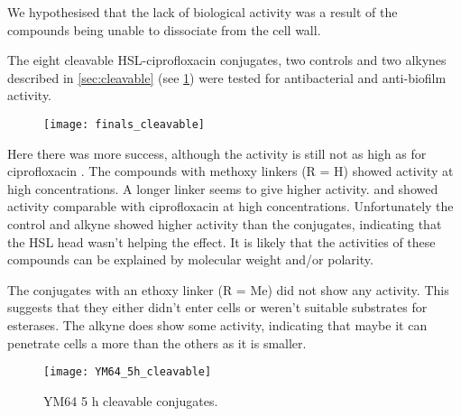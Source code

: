 We hypothesised that the lack of biological activity was a result of the compounds being unable to dissociate from the cell wall. 






The eight cleavable HSL-ciprofloxacin conjugates, two controls and two alkynes described in \ref{sec:cleavable} (see \ref{fgr:finals_cleavable}) were tested for antibacterial and anti-biofilm activity. 

\begin{figure}[H]
	\begin{center}
		\texttt{[image: finals\_cleavable]}
		\caption{
 		\label{fgr:finals_cleavable}}
	\end{center}
\end{figure}

Here there was more success, although the activity is still not as high as for ciprofloxacin .
The compounds with methoxy linkers (R = H) showed activity at high concentrations. A longer linker seems to give higher activity.  and  showed activity comparable with ciprofloxacin  at high concentrations.
Unfortunately the control  and alkyne  showed higher activity than the conjugates, indicating that the HSL head wasn't helping the effect.
It is likely that the activities of these compounds can be explained by molecular weight and/or polarity.

The conjugates with an ethoxy linker (R = Me) did not show any activity. This suggests that they either didn't enter cells or weren't suitable substrates for esterases.
The alkyne does show some activity, indicating that maybe it can penetrate cells a more than the others as it is smaller.

\begin{figure}[H]
	\begin{center}
		\texttt{[image: YM64\_5h\_cleavable]}
		\caption{YM64 5 h cleavable conjugates.\label{fgr:YM64_5h_cleavable}}
	\end{center}
\end{figure}

